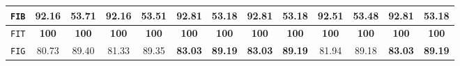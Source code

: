 \begin{sidewaystable}[htpb]
\begin{tabular}{| c | c c | c c | c c | c c | c c | c c |}
                \hline
                \texttt{FIB} & 92.16 & 53.71 & 92.16 & 53.51 & \textbf{92.81} & \textbf{53.18} & \textbf{92.81} & \textbf{53.18} & 92.51 & 53.48 & \textbf{92.81} & \textbf{53.18} \\
                \hline
                \texttt{FIT} & \textbf{100} & \textbf{100} & \textbf{100} & \textbf{100} & \textbf{100} & \textbf{100} & \textbf{100} & \textbf{100} & \textbf{100} & \textbf{100} & \textbf{100} & \textbf{100} \\
                \hline
                \texttt{FIG} & 80.73 & 89.40 & 81.33 & 89.35 & \textbf{83.03} & \textbf{89.19} & \textbf{83.03} & \textbf{89.19} & 81.94 & 89.18 & \textbf{83.03} & \textbf{89.19} \\
                \hline
            \end{tabular}
            \caption{
                \label{tab::stats_gk_scat_svm_f3}
                \gls{acr::svm} results using graph kernels and \glspl{acr::scatnet}, expressed in percentage, on the two datasets at \textbf{\gls{acr::efin}} level 3.
            }
        \end{sidewaystable}

